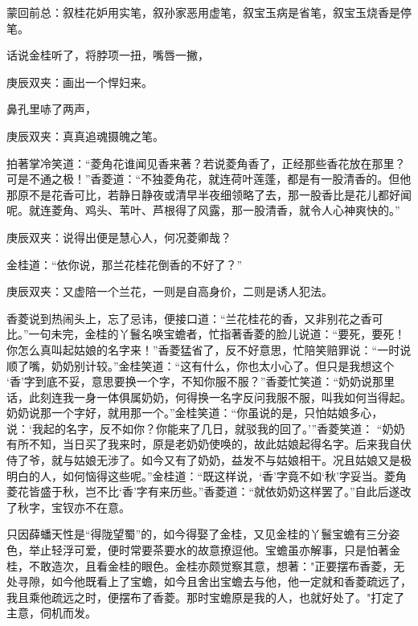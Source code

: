 
\begin{parag}
    \begin{note}蒙回前总：叙桂花妒用实笔，叙孙家恶用虚笔，叙宝玉病是省笔，叙宝玉烧香是停笔。\end{note}
\end{parag}


\begin{parag}
    话说金桂听了，将脖项一扭，嘴唇一撇，\begin{note}庚辰双夹：画出一个悍妇来。\end{note}鼻孔里哧了两声，\begin{note}庚辰双夹：真真追魂摄魄之笔。\end{note}拍著掌冷笑道：“菱角花谁闻见香来著？若说菱角香了，正经那些香花放在那里？可是不通之极！”香菱道：“不独菱角花，就连荷叶莲蓬，都是有一股清香的。但他那原不是花香可比，若静日静夜或清早半夜细领略了去，那一股香比是花儿都好闻呢。就连菱角、鸡头、苇叶、芦根得了风露，那一股清香，就令人心神爽快的。”\begin{note}庚辰双夹：说得出便是慧心人，何况菱卿哉？\end{note}金桂道：“依你说，那兰花桂花倒香的不好了？”\begin{note}庚辰双夹：又虚陪一个兰花，一则是自高身价，二则是诱人犯法。\end{note}香菱说到热闹头上，忘了忌讳，便接口道：“兰花桂花的香，又非别花之香可比。”一句未完，金桂的丫鬟名唤宝蟾者，忙指著香菱的脸儿说道：“要死，要死！你怎么真叫起姑娘的名字来！”香菱猛省了，反不好意思，忙陪笑赔罪说：“一时说顺了嘴，奶奶别计较。”金桂笑道：“这有什么，你也太小心了。但只是我想这个 ‘香’字到底不妥，意思要换一个字，不知你服不服？”香菱忙笑道：“奶奶说那里话，此刻连我一身一体俱属奶奶，何得换一名字反问我服不服，叫我如何当得起。奶奶说那一个字好，就用那一个。”金桂笑道：“你虽说的是，只怕姑娘多心，说：‘我起的名字，反不如你？你能来了几日，就驳我的回了。’”香菱笑道： “奶奶有所不知，当日买了我来时，原是老奶奶使唤的，故此姑娘起得名字。后来我自伏侍了爷，就与姑娘无涉了。如今又有了奶奶，益发不与姑娘相干。况且姑娘又是极明白的人，如何恼得这些呢。”金桂道：“既这样说，‘香’字竟不如‘秋’字妥当。菱角菱花皆盛于秋，岂不比‘香’字有来历些。”香菱道：“就依奶奶这样罢了。”自此后遂改了秋字，宝钗亦不在意。
\end{parag}


\begin{parag}
    只因薛蟠天性是“得陇望蜀”的，如今得娶了金桂，又见金桂的丫鬟宝蟾有三分姿色，举止轻浮可爱，便时常要茶要水的故意撩逗他。宝蟾虽亦解事，只是怕著金桂，不敢造次，且看金桂的眼色。金桂亦颇觉察其意，想著："正要摆布香菱，无处寻隙，如今他既看上了宝蟾，如今且舍出宝蟾去与他，他一定就和香菱疏远了，我且乘他疏远之时，便摆布了香菱。那时宝蟾原是我的人，也就好处了。"打定了主意，伺机而发。
\end{parag}


